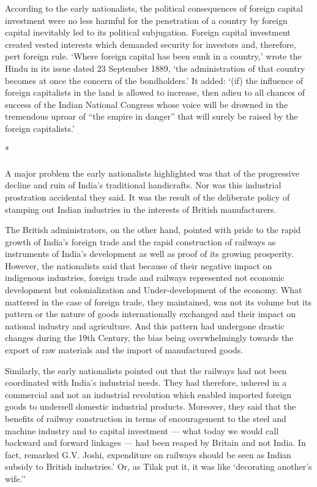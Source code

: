 \begin{multicols}{2}
According to the early nationalists, the political consequences of foreign capital investment were no less harmful for the penetration of a country by foreign capital inevitably led to its political subjugation. Foreign capital investment created vested interests which demanded security for investors and, therefore, pert foreign rule. `Where foreign capital has been sunk in a country,' wrote the Hindu in its issue dated 23 September 1889, `the administration of that country becomes at once the concern of the bondholders.' It added: `(if) the influence of foreign capitalists in the land is allowed to increase, then adieu to all chances of success of the Indian National Congress whose voice will be drowned in the tremendous uproar of ``the empire in danger'' that will surely be raised by the foreign capitalists.'

\begin{center}*\end{center}

\paragraph*{}

A major problem the early nationalists highlighted was that of the progressive decline and ruin of India's traditional handicrafts. Nor was this industrial prostration accidental they said. It was the result of the deliberate policy of stamping out Indian industries in the interests of British manufacturers.

The British administrators, on the other hand, pointed with pride to the rapid growth of India's foreign trade and the rapid construction of railways as instruments of India's development as well as proof of its growing prosperity. However, the nationalists said that because of their negative impact on indigenous industries, foreign trade and railways represented not economic development but colonialization and Under-development of the economy. What mattered in the case of foreign trade, they maintained, was not its volume but its pattern or the nature of goods internationally exchanged and their impact on national industry and agriculture. And this pattern had undergone drastic changes during the 19th Century, the bias being overwhelmingly towards the export of raw materials and the import of manufactured goods.

Similarly, the early nationalists pointed out that the railways had not been coordinated with India's industrial needs. They had therefore, ushered in a commercial and not an industrial revolution which enabled imported foreign goods to undersell domestic industrial products. Moreover, they said that the benefits of railway construction in terms of encouragement to the steel and machine industry and to capital investment --- what today we would call backward and forward linkages --- had been reaped by Britain and not India. In fact, remarked G.V. Joshi, expenditure on railways should be seen as Indian subsidy to British industries.' Or, as Tilak put it, it was like `decorating another's wife.''


\end{multicols}
